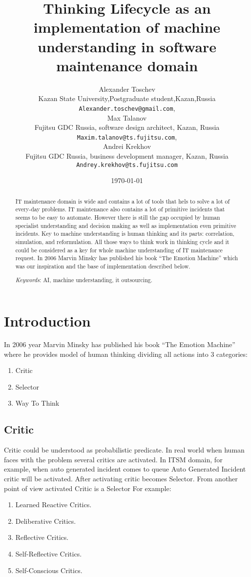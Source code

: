 \documentclass[12pt]{article}
\title{Thinking Lifecycle as an implementation of machine understanding in software maintenance domain}
\author{Alexander Toschev\\
Kazan State University,Postgraduate student,Kazan,Russia\\
\texttt{Alexander.toschev@gmail.com},\\
Max Talanov\\Fujitsu GDC Russia, software design architect, Kazan, Russia\\
\texttt{Maxim.talanov@ts.fujitsu.com},\\
Andrei Krekhov\\
Fujitsu GDC Russia, business development manager, Kazan, Russia\\
\texttt{Andrey.krekhov@ts.fujitsu.com}
}
\date{\today}
\begin{document}
\maketitle

\begin{abstract}
IT maintenance domain is wide and contains a lot of tools that hels to solve a lot of every-day problems. IT maintenance also contains a lot of primitive incidents that seems to be easy to automate. However there is still the gap occupied by human specialist understanding and decision making as well as implementation even primitive incidents. Key to machine understanding is human thinking and its parts: correlation, simulation, and reformulation. All those ways to think work in thinking cycle and it could be considered as a key for whole machine understanding of IT maintenance request. In 2006 Marvin Minsky has published his book “The Emotion Machine” which was our inspiration and the base of implementation described below.

\emph{Keywords}: AI, machine understanding, it outsourcing.

\end{abstract}

\section{Introduction}
In 2006 year Marvin Minsky has published his book “The Emotion Machine” where he provides model of human thinking dividing all actions into 3 categories:

\begin{enumerate}
 \item Critic
 \item Selector
 \item Way To Think
\end{enumerate}

\subsection{Critic}
Critic could be understood as probabilistic predicate. In real world when human faces with the problem several critics are activated. In ITSM domain, for example, when auto generated incident comes to queue Auto Generated Incident critic will be activated. After activating critic becomes Selector. From another point of view activated Critic is a Selector
For example:

\begin{enumerate}
 \item Learned Reactive Critics.
 \item Deliberative Critics.
 \item Reflective Critics.
 \item Self-Reflective Critics.
 \item Self-Conscious Critics.
\end{enumerate}
\end{document}
